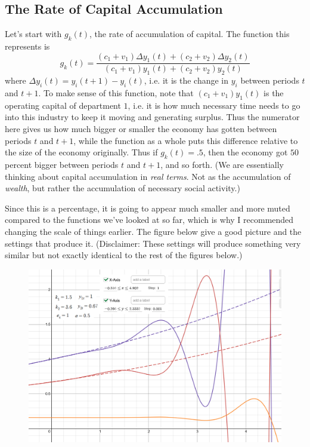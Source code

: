 \documentclass{article}
\theoremstyle{theorem}
\begin{document}
\subsection{The Rate of Capital Accumulation}
 Let's start with $g_k(t)$, the rate of accumulation of capital. The function this represents is
\[ g_k(t) = \frac{(c_1+v_1)\Delta y_1(t) + (c_2+v_2)\Delta y_2(t)}{(c_1+v_1)y_1(t) + (c_2+v_2)y_2(t)} \]
where $\Delta y_i(t) = y_i(t+1)-y_i(t)$, i.e. it is the change in $y_i$ between periods $t$ and $t+1$. To make sense of this function, note that $(c_1+v_1)y_1(t)$ is the operating capital of department $1$, i.e. it is how much necessary time needs to go into this industry to keep it moving and generating surplus. Thus the numerator here gives us how much bigger or smaller the economy has gotten between periods $t$ and $t+1$, while the function as a whole puts this difference relative to the size of the economy originally. Thus if $g_k(t)=.5$, then the economy got $50$ percent bigger between periods $t$ and $t+1$, and so forth. (We are essentially thinking about capital accumulation in \emph{real terms}. Not as the accumulation of \emph{wealth}, but rather the accumulation of necessary social activity.) \par 
Since this is a percentage, it is going to appear much smaller and more muted compared to the functions we've looked at so far, which is why I recommended changing the scale of things earlier. The figure below give a good picture and the settings that produce it. (Disclaimer: These settings will produce something very similar but not exactly identical to the rest of the figures below.)
\begin{figure}[H]
\centering
\includegraphics[scale=.6]{Images/rateOfAccumulation}
\end{figure}
\end{document}
